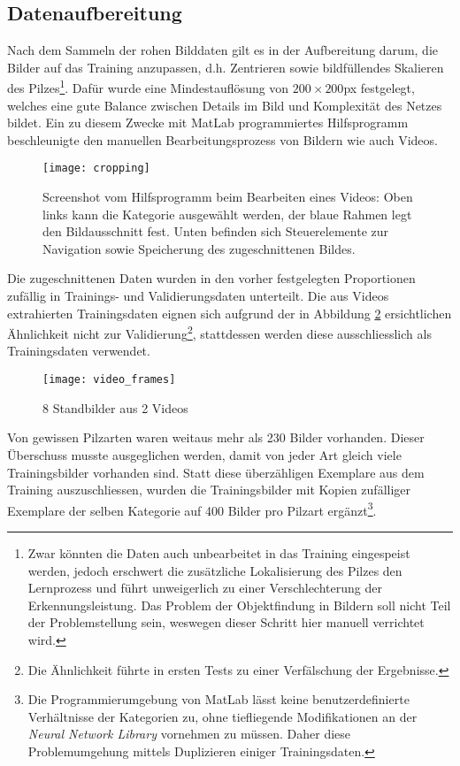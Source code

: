 \subsection{Datenaufbereitung}
Nach dem Sammeln der rohen Bilddaten gilt es in der Aufbereitung darum, die Bilder auf das Training anzupassen, d.h. Zentrieren sowie bildfüllendes Skalieren des Pilzes\footnote{Zwar könnten die Daten auch unbearbeitet in das Training eingespeist werden, jedoch erschwert die zusätzliche Lokalisierung des Pilzes den Lernprozess und führt unweigerlich zu einer Verschlechterung der Erkennungsleistung. Das Problem der Objektfindung in Bildern soll nicht Teil der Problemstellung sein, weswegen dieser Schritt hier manuell verrichtet wird.}. Dafür wurde eine Mindestauflösung von $200 \times 200$px festgelegt, welches eine gute Balance zwischen Details im Bild und Komplexität des Netzes bildet. Ein zu diesem Zwecke mit MatLab programmiertes Hilfsprogramm beschleunigte den manuellen Bearbeitungsprozess von Bildern wie auch Videos.
\begin{figure}[h]
	\centering
	\texttt{[image: cropping]}
	\caption[\textit{\textit{Hilfsprogramm}}]{Screenshot vom Hilfsprogramm beim Bearbeiten eines Videos: Oben links kann die Kategorie ausgewählt werden, der blaue Rahmen legt den Bildausschnitt fest. Unten befinden sich Steuerelemente zur Navigation sowie Speicherung des zugeschnittenen Bildes.}
	\label{img:precrocessing}
\end{figure}

Die zugeschnittenen Daten wurden in den vorher festgelegten Proportionen zufällig in Trainings- und Validierungsdaten unterteilt. Die aus Videos extrahierten Trainingsdaten eignen sich aufgrund der in Abbildung \ref{img:video_frames} ersichtlichen Ähnlichkeit nicht zur Validierung\footnote{Die Ähnlichkeit führte in ersten Tests zu einer Verfälschung der Ergebnisse.}, stattdessen werden diese ausschliesslich als Trainingsdaten verwendet.

\begin{figure}[h]
	\centering
	\texttt{[image: video\_frames]}
	\caption[\textit{\textit{Video-Frames}}]{8 Standbilder aus 2 Videos}
	\label{img:video_frames}
\end{figure}

Von gewissen Pilzarten waren weitaus mehr als 230 Bilder vorhanden. Dieser Überschuss musste ausgeglichen werden, damit von jeder Art gleich viele Trainingsbilder vorhanden sind. Statt diese überzähligen Exemplare aus dem Training auszuschliessen, wurden die Trainingsbilder mit Kopien zufälliger Exemplare der selben Kategorie auf 400 Bilder pro Pilzart ergänzt\footnote{Die Programmierumgebung von MatLab lässt keine benutzerdefinierte Verhältnisse der Kategorien zu, ohne tiefliegende Modifikationen an der \textit{Neural Network Library} vornehmen zu müssen. Daher diese Problemumgehung mittels Duplizieren einiger Trainingsdaten.}.

